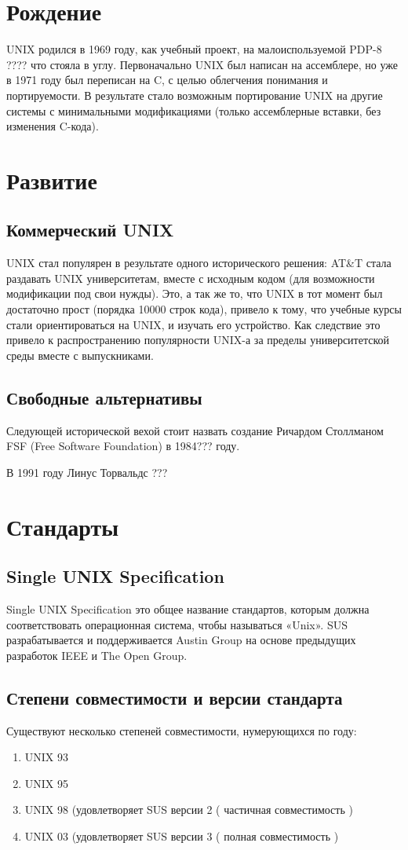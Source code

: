\section {Рождение}
UNIX родился в 1969 году, как учебный проект, на малоиспользуемой PDP-8 ???? что стояла в углу.
Первоначально UNIX был написан на ассемблере, но уже в 1971 году был переписан на C, с целью облегчения понимания и портируемости. В результате стало возможным портирование UNIX на другие системы с минимальными модификациями (только ассемблерные вставки, без изменения C-кода).
\section {Развитие}
\subsection {Коммерческий UNIX}
UNIX стал популярен в результате одного исторического решения: AT\&T стала раздавать UNIX университетам, вместе с исходным кодом (для возможности модификации под свои нужды). Это, а так же то, что UNIX в тот момент был достаточно прост (порядка 10000 строк кода), привело к тому, что учебные курсы стали ориентироваться на UNIX, и изучать его устройство. Как следствие это привело к распространению популярности UNIX-а за пределы университетской среды вместе с выпускниками.
\subsection {Свободные альтернативы}
Следующей исторической вехой стоит назвать создание Ричардом Столлманом FSF (Free Software Foundation) в 1984??? году. 

В 1991 году Линус Торвальдс ???
\section {Стандарты}
\subsection {Single UNIX Specification}
Single UNIX Specification это общее название стандартов, которым должна соответствовать операционная система, чтобы называться «Unix». SUS разрабатывается и поддерживается Austin Group на основе предыдущих разработок IEEE и The Open Group.
\subsection {Степени совместимости и версии стандарта}
Существуют несколько степеней совместимости, нумерующихся по году:
\begin{enumerate}
\item UNIX 93
\item UNIX 95
\item UNIX 98 (удовлетворяет SUS версии 2 ( частичная совместимость )
\item UNIX 03 (удовлетворяет SUS версии 3 ( полная совместимость )
\end{enumerate}
